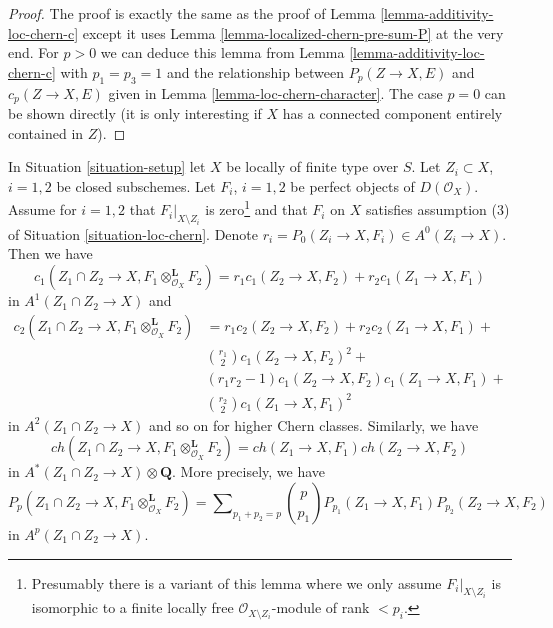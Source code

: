 \begin{proof}
The proof is exactly the same as the proof of
Lemma \ref{lemma-additivity-loc-chern-c}
except it uses
Lemma \ref{lemma-localized-chern-pre-sum-P}
at the very end. For $p > 0$ we can deduce this lemma
from Lemma \ref{lemma-additivity-loc-chern-c} with $p_1 = p_3 = 1$
and the relationship between $P_p(Z \to X, E)$ and $c_p(Z \to X, E)$ given in
Lemma \ref{lemma-loc-chern-character}. The case $p = 0$ can be shown
directly (it is only interesting if $X$ has a connected component
entirely contained in $Z$).
\end{proof}

\begin{lemma}
\label{lemma-loc-chern-tensor-product}
In Situation \ref{situation-setup} let $X$ be locally of finite type over $S$.
Let $Z_i \subset X$, $i = 1, 2$ be closed subschemes. Let $F_i$, $i = 1, 2$
be perfect objects of $D(\mathcal{O}_X)$. Assume for $i = 1, 2$ that
$F_i|_{X \setminus Z_i}$ is zero\footnote{Presumably there
is a variant of this lemma where we only assume $F_i|_{X \setminus Z_i}$
is isomorphic to a finite locally free $\mathcal{O}_{X \setminus Z_i}$-module
of rank $< p_i$.} and that $F_i$ on $X$ satisfies assumption
(3) of Situation \ref{situation-loc-chern}. Denote
$r_i = P_0(Z_i \to X, F_i) \in A^0(Z_i \to X)$.
Then we have
$$
c_1(Z_1 \cap Z_2 \to X, F_1 \otimes_{\mathcal{O}_X}^\mathbf{L} F_2) =
r_1 c_1(Z_2 \to X, F_2) + r_2 c_1(Z_1 \to X, F_1)
$$
in $A^1(Z_1 \cap Z_2 \to X)$ and
\begin{align*}
c_2(Z_1 \cap Z_2 \to X, F_1 \otimes_{\mathcal{O}_X}^\mathbf{L} F_2)
& =
r_1 c_2(Z_2 \to X, F_2) +
r_2 c_2(Z_1 \to X, F_1) + \\
& {r_1 \choose 2} c_1(Z_2 \to X, F_2)^2 + \\
& (r_1r_2 - 1) c_1(Z_2 \to X, F_2)c_1(Z_1 \to X, F_1) + \\
& {r_2 \choose 2} c_1(Z_1 \to X, F_1)^2
\end{align*}
in $A^2(Z_1 \cap Z_2 \to X)$ and so on for higher Chern classes.
Similarly, we have
$$
ch(Z_1 \cap Z_2 \to X, F_1 \otimes_{\mathcal{O}_X}^\mathbf{L} F_2) =
ch(Z_1 \to X, F_1) ch(Z_2 \to X, F_2)
$$
in $A^*(Z_1 \cap Z_2 \to X) \otimes \mathbf{Q}$. More precisely, we have
$$
P_p(Z_1 \cap Z_2 \to X, F_1 \otimes_{\mathcal{O}_X}^\mathbf{L} F_2) =
\sum\nolimits_{p_1 + p_2 = p}
{p \choose p_1} P_{p_1}(Z_1 \to X, F_1) P_{p_2}(Z_2 \to X, F_2)
$$
in $A^p(Z_1 \cap Z_2 \to X)$.
\end{lemma}

